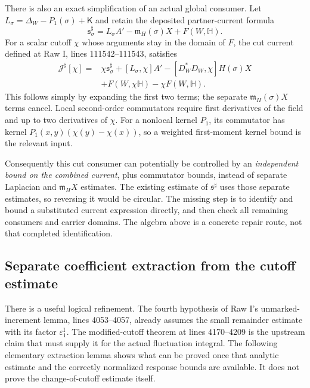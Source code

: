 \documentclass[11pt]{article}
\theoremstyle{remark}
\begin{document}
There is also an exact simplification of an actual global consumer.
Let $L_\sigma=\Delta_W-P_1(\sigma)+\mathsf K$ and retain the
deposited partner-current formula
\[
 \mathfrak s^\sharp_\sigma
   =L_\sigma A'-\mathfrak m_H(\sigma)X+F(W,\mathbb H).
\]
For a scalar cutoff $\chi$ whose arguments stay in the domain of $F$,
the cut current defined at Raw I, lines 111542--111543, satisfies
\[
 \begin{split}
 \mathcal J^\sharp[\chi]={}&\chi\mathfrak s^\sharp_\sigma
    +[L_\sigma,\chi]A'
    -[D_W^*D_W,\chi]H(\sigma)X\\
   &+F(W,\chi\mathbb H)-\chi F(W,\mathbb H).
 \end{split}
\]
This follows simply by expanding the first two terms; the separate
$\mathfrak m_H(\sigma)X$ terms cancel. Local second-order commutators
require first derivatives of the field and up to two derivatives of
$\chi$. For a nonlocal kernel $P_1$, its commutator has kernel
$P_1(x,y)(\chi(y)-\chi(x))$, so a weighted first-moment kernel bound
is the relevant input.

Consequently this cut consumer can potentially be controlled by an
\emph{independent bound on the combined current}, plus commutator
bounds, instead of separate Laplacian and $\mathfrak m_HX$ estimates.
The existing estimate of $\mathfrak s^\sharp$ uses those separate
estimates, so reversing it would be circular. The missing step is to
identify and bound a substituted current expression directly, and then
check all remaining consumers and carrier domains. The algebra above
is a concrete repair route, not that completed identification.

\subsection{Separate coefficient extraction from the cutoff estimate}

There is a useful logical refinement. The fourth hypothesis of Raw I's
unmarked-increment lemma, lines 4053--4057, already assumes the small
remainder estimate with its factor $\varepsilon_1^{\mathrm I}$.
The modified-cutoff theorem at lines 4170--4209 is the upstream claim
that must supply it for the actual fluctuation integral. The following
elementary extraction lemma shows what can be proved once that analytic
estimate and the correctly normalized response bounds are available.
It does not prove the change-of-cutoff estimate itself.
\end{document}
